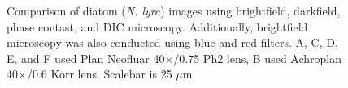 \begin{figure}[h]
 \hspace{0.1mm}
\caption[Clockwise from top left:bright,dark,pc,blue,red,dic]{Comparison of diatom (\textit{N. lyra}) images using brightfield, darkfield, phase contast, and DIC microscopy. 
Additionally, brightfield microscopy was also conducted using blue and red filters. 
A, C, D, E, and F used Plan Neofluar 40$\times$/0.75 Ph2 lens, B used Achroplan 40$\times$/0.6 Korr lens. 
Scalebar is 25 $\mu$m.} 
\label{fig:diatomes}
\end{figure}

